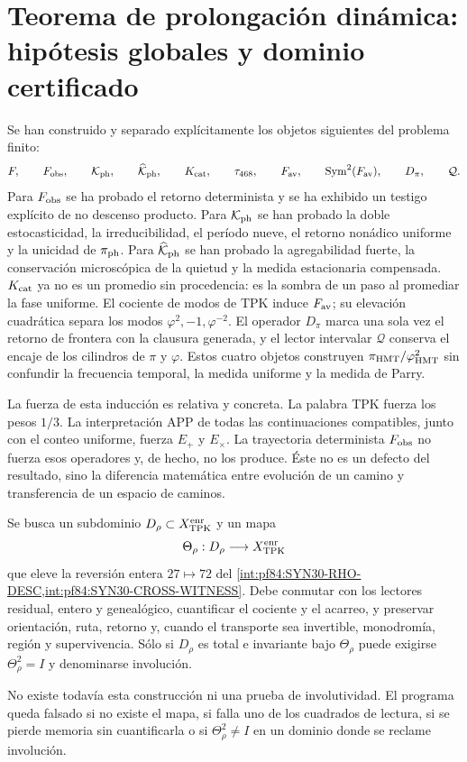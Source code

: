 \section{Teorema de prolongación dinámica: hipótesis globales y dominio certificado}

Se han construido y separado explícitamente los objetos siguientes del
problema finito:
\[
 F,
 \qquad
 F_{\rm obs},
 \qquad
 \mathcal K_{\rm ph},
 \qquad
 \widehat{\mathcal K}_{\rm ph},
 \qquad
 K_{\rm cat},
 \qquad
 \tau_{468},
 \qquad
 F_{\rm av},
 \qquad
 \operatorname{Sym}^2(F_{\rm av}),
 \qquad
 D_\pi,
 \qquad
 \mathcal Q.
\]
Para \(F_{\rm obs}\) se ha probado el retorno determinista y se ha exhibido un
testigo explícito de no descenso producto. Para \(\mathcal K_{\rm ph}\) se
han probado la doble estocasticidad, la irreducibilidad, el período nueve, el
retorno nonádico uniforme y la unicidad de
\(\pi_{\rm ph}\). Para \(\widehat{\mathcal K}_{\rm ph}\) se han probado la
agregabilidad fuerte, la conservación microscópica de la quietud y la medida
estacionaria compensada. \(K_{\rm cat}\) ya no es un promedio sin
procedencia: es la sombra de un paso al promediar la fase uniforme.
El cociente de modos de TPK induce \(F_{\rm av}\); su elevación cuadrática
separa los modos \(\varphi^2,-1,\varphi^{-2}\). El operador \(D_\pi\)
marca una sola vez el retorno de frontera con la clausura generada, y el
lector intervalar \(\mathcal Q\) conserva el encaje de los cilindros de
\(\pi\) y \(\varphi\). Estos cuatro objetos construyen
\(\pi_{\rm HMT}/\varphi_{\rm HMT}^2\) sin confundir la frecuencia temporal,
la medida uniforme y la medida de Parry.

La fuerza de esta inducción es relativa y concreta. La palabra TPK fuerza los
pesos \(1/3\). La interpretación APP de todas las continuaciones compatibles,
junto con el conteo uniforme, fuerza \(E_+\) y \(E_\times\). La trayectoria
determinista \(F_{\rm obs}\) no fuerza esos operadores y, de hecho, no los
produce. Éste no es un defecto del resultado, sino la diferencia matemática
entre evolución de un camino y transferencia de un espacio de caminos.

\ifdefined\HMTInternalTraceability
\begin{criterion}
\label{pf84:SYN31-RHO-LIFT}
Se busca un subdominio \(D_\rho\subset X_{\rm TPK}^{\rm enr}\) y un mapa
\[
 \Theta_\rho:D_\rho\longrightarrow X_{\rm TPK}^{\rm enr}
\]
que eleve la reversión entera \(27\mapsto72\) del
\cref{int:pf84:SYN30-RHO-DESC,int:pf84:SYN30-CROSS-WITNESS}. Debe conmutar con los
lectores residual, entero y genealógico, cuantificar el cociente y el
acarreo, y preservar orientación, ruta, retorno y, cuando el transporte sea
invertible, monodromía, región y supervivencia.
Sólo si \(D_\rho\) es total e invariante bajo \(\Theta_\rho\) puede exigirse
\(\Theta_\rho^2=I\) y denominarse involución.

No existe todavía esta construcción ni una prueba de involutividad. El
programa queda falsado si no existe el mapa, si falla uno de los cuadrados
de lectura, si se pierde memoria sin cuantificarla o si
\(\Theta_\rho^2\ne I\) en un dominio donde se reclame involución.
\end{criterion}

